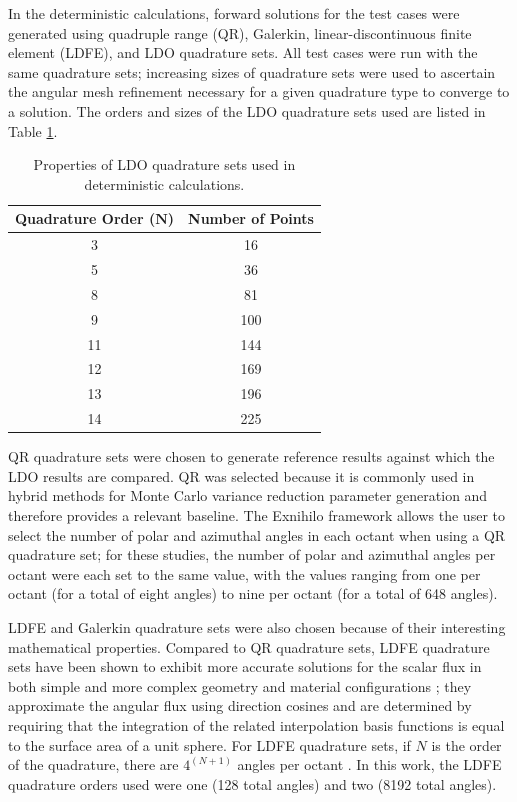 \documentclass{article} %
\begin{document}
In the deterministic calculations, forward solutions for the test cases were
generated using quadruple range (QR), Galerkin, linear-discontinuous finite 
element (LDFE), and LDO quadrature sets. All test cases were run with the same 
quadrature sets; increasing sizes of quadrature sets were used to ascertain the
angular mesh refinement necessary for a given quadrature type to converge to a 
solution. The orders and sizes of the LDO quadrature sets used are listed in
Table \ref{ldo-n}.

\begin{table}[!htb]
\centering
\caption{Properties of LDO quadrature sets used in deterministic calculations.}
\begin{tabular}{cc}
\multicolumn{1}{l}{\textbf{Quadrature Order ($\mathbf{N}$)}} & 
\multicolumn{1}{l}{\textbf{Number of Points}} \\
\hline
3 & 16 \\
5 & 36 \\
8 & 81 \\
9 & 100 \\
11 & 144 \\
12 & 169 \\
13 & 196 \\
14 & 225 \\
\end{tabular}
\label{ldo-n}
\end{table}

QR quadrature sets were chosen to generate reference results against which
the LDO results are compared. QR was selected because it is commonly used 
in hybrid methods for Monte Carlo variance reduction parameter generation and 
therefore provides a relevant baseline. The Exnihilo framework allows the user
to select the number of polar and azimuthal angles in each octant when using a
QR quadrature set; for these studies, the number of polar and azimuthal angles
per octant were each set to the same value, with the values ranging from one
per octant (for a total of eight angles) to nine per octant (for a total of
648 angles). 

LDFE and Galerkin quadrature sets were also chosen because of their interesting
mathematical properties. Compared to QR quadrature sets, LDFE quadrature sets
have been shown to exhibit more accurate solutions for the scalar flux in both 
simple and more complex geometry and material configurations \cite{ldfe}; they 
approximate the angular flux using direction cosines and are determined by
requiring that the integration of the related interpolation basis functions is
equal to the surface area of a unit sphere. For LDFE quadrature sets, if $N$ is
the order of the quadrature, there are $4^{(N+1)}$ angles per octant
\cite{exum}. In this work, the LDFE quadrature orders used were one (128 total
angles) and two (8192 total angles).
\end{document}
